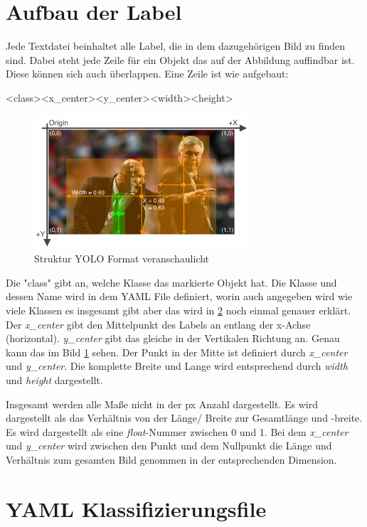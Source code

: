 \section{Aufbau der Label}
Jede Textdatei beinhaltet alle Label, die in dem dazugehörigen Bild zu finden sind. Dabei steht jede Zeile für ein Objekt das auf der Abbildung auffindbar ist. Diese können sich auch überlappen. Eine Zeile ist wie aufgebaut:
\begin{tcolorbox}
    \textless class\textgreater\space \textless x\_center\textgreater \space \textless y\_center\textgreater \space\textless width\textgreater \space\textless height\textgreater 
\end{tcolorbox}
\begin{figure}
    \begin{center}
        \includegraphics[width=8cm]{data/img/yolo_picture_structure.png}    
        \caption{Struktur YOLO Format veranschaulicht}
        \label{fig:yoloFormat}
    \end{center}
\end{figure}
Die "class" gibt an, welche Klasse das markierte Objekt hat. Die Klasse und dessen Name wird in dem YAML File definiert, worin auch angegeben wird wie viele Klassen es insgesamt gibt aber das wird in \ref{sec:yaml_class} noch einmal genauer erklärt. Der \textit{x\_center} gibt den Mittelpunkt des Labels an entlang der x-Achse (horizontal). \textit{y\_center} gibt das gleiche in der Vertikalen Richtung an. Genau kann das im Bild \ref{fig:yoloFormat} sehen. Der Punkt in der Mitte ist definiert durch \textit{x\_center} und \textit{y\_center}. Die komplette Breite und Lange wird entsprechend durch \textit{width} und \textit{height} dargestellt. 

Insgesamt werden alle Maße nicht in der px Anzahl dargestellt. Es wird dargestellt als das Verhältnis von der Länge/ Breite zur Gesamtlänge und -breite. Es wird dargestellt als eine \textit{float}-Nummer zwischen 0 und 1. Bei dem \textit{x\_center} und \textit{y\_center} wird zwischen den Punkt und dem Nullpunkt die Länge und Verhältnis zum gesamten Bild genommen in der entsprechenden Dimension. 

\section{YAML Klassifizierungsfile}
\label{sec:yaml_class}
